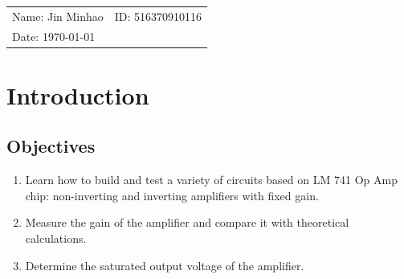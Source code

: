 \documentclass{article}
\begin{document}
\vspace*{0.25cm}
\hrulefill
\thispagestyle{empty}

\begin{center}
\begin{large}
\end{large}

\hrulefill

\vspace*{5cm}
\begin{Large}
\end{Large}

\vspace{2em}

\begin{large}
\end{large}
\end{center}


\vfill

\begin{table}[h!]
\flushleft
\begin{tabular}{ll}
Name: Jin Minhao \hspace*{2em}&
ID: 516370910116\hspace*{2em}\\





Date: \today

\end{tabular}
\end{table}


\newpage
\section{Introduction}
\subsection{Objectives}
\begin{enumerate}
	\item Learn how to build and test a variety of circuits based on LM 741 Op Amp chip:
	non-inverting and inverting amplifiers with fixed gain.
	\item Measure the gain of the amplifier and compare it with theoretical calculations.
	\item Determine the saturated output voltage of the amplifier.
\end{enumerate}
\end{document}
